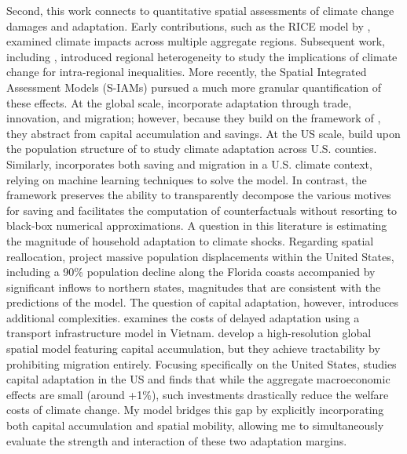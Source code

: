 \documentclass[12pt, a4paper]{article}
\begin{document}
Second, this work connects to quantitative spatial assessments of climate change damages and adaptation. Early contributions, such as the RICE model by \cite{nordhaus_regional_1996}, examined climate impacts across multiple aggregate regions. Subsequent work, including \cite{dennig_inequality_2015}, introduced regional heterogeneity to study the implications of climate change for intra-regional inequalities. More recently, the Spatial Integrated Assessment Models (S-IAMs) pursued a much more granular quantification of these effects. At the global scale, \cite{desmet_climate_2024} incorporate adaptation through trade, innovation, and migration; however, because they build on the framework of \cite{desmet_geography_2018}, they abstract from capital accumulation and savings. At the US scale, \cite{bilal_anticipating_nodate} build upon the population structure of \cite{kleinman_dynamic_2023} to study climate adaptation across U.S. counties. Similarly, \cite{sun_wealth_2025} incorporates both saving and migration in a U.S. climate context, relying on machine learning techniques to solve the model. In contrast, the framework preserves the ability to transparently decompose the various motives for saving and facilitates the computation of counterfactuals without resorting to black-box numerical approximations. A question in this literature is estimating the magnitude of household adaptation to climate shocks. Regarding spatial reallocation, \cite{bilal_anticipating_nodate} project massive population displacements within the United States, including a 90\% population decline along the Florida coasts accompanied by significant inflows to northern states, magnitudes that are consistent with the predictions of the model. The question of capital adaptation, however, introduces additional complexities. \cite{balboni_harms_2025} examines the costs of delayed adaptation using a transport infrastructure model in Vietnam. \cite{krusell_climate_2022} develop a high-resolution global spatial model featuring capital accumulation, but they achieve tractability by prohibiting migration entirely. Focusing specifically on the United States, \cite{fried_seawalls_2022} studies capital adaptation in the US and finds that while the aggregate macroeconomic effects are small (around +1\%), such investments drastically reduce the welfare costs of climate change. My model bridges this gap by explicitly incorporating both capital accumulation and spatial mobility, allowing me to simultaneously evaluate the strength and interaction of these two adaptation margins. \\ 
\end{document}
